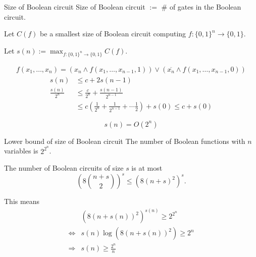 \documentclass{beamer}
\begin{document}
\begin{frame}{Size of Boolean circuit}
Size of Boolean circuit $:=$ \# of gates in the Boolean circuit.

Let $C(f)$ be a smallest size of Boolean circuit computing $f\colon\{0,1\}^n\to\{0,1\}$.

Let $s(n) := \max_{f\colon\{0,1\}^n\to\{0,1\}} C(f)$.

\begin{align*}
f(x_1,\dotsc,x_n) = (x_n \wedge f(x_1,\dotsc,x_{n-1}, 1)) \vee (\overline{x_n} \wedge f(x_1,\dotsc,x_{n-1}, 0))
\end{align*}
\begin{align*}
s(n) &\le c + 2 s(n-1)\\
\frac{s(n)}{2^n} &\le \frac{c}{2^n} + \frac{s(n-1)}{2^{n-1}}\\
&\le c \left(\frac1{2^n} + \frac1{2^{n-1}} + \dotsb \frac12\right) + s(0) \le c + s(0)
\end{align*}
\begin{center}
\begin{equation*}
s(n) = O(2^n)
\end{equation*}
\end{center}
\end{frame}

\begin{frame}{Lower bound of size of Boolean circuit}
The number of Boolean functions with $n$ variables is $2^{2^n}$.

\vspace{1em}
The number of Boolean circuits of size $s$ is at most
\begin{equation*}
\left(8\binom{n+s}{2}\right)^s
\le (8(n+s)^2)^{s}.
\end{equation*}

This means
\begin{align*}
& (8(n+s(n))^2)^{s(n)}\ge 2^{2^n} \\
\iff& {s(n)}\log(8(n+s(n))^2)\ge 2^n\\
\Longrightarrow& s(n)\ge \frac{2^n}{n}
\end{align*}
\end{frame}
\end{document}
